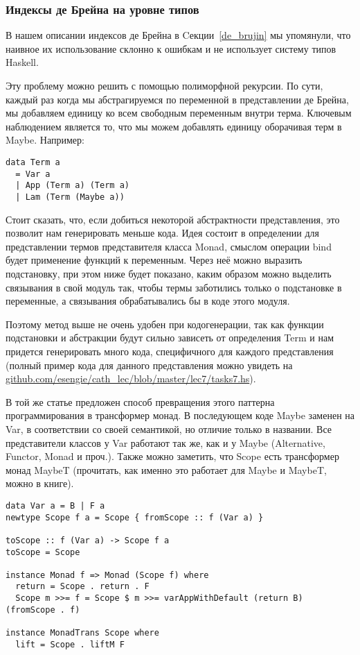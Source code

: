 \subsubsection{Индексы де Брейна на уровне типов}\label{de_brujin_impl}
В нашем описании индексов де Брейна в Cекции~\ref{de_brujin} мы упомянули, что наивное их использование склонно к ошибкам и не использует систему типов Haskell.

Эту проблему можно решить с помощью полиморфной рекурсии\cite{Bird:Pat}. По сути, каждый раз когда мы абстрагируемся по переменной в представлении де Брейна, мы добавляем единицу ко всем свободным переменным внутри терма. Ключевым наблюдением является то, что мы можем добавлять единицу оборачивая терм в Maybe. Например:

\begin{lstlisting}[frame=single]
data Term a
  = Var a
  | App (Term a) (Term a)
  | Lam (Term (Maybe a))
\end{lstlisting}

Стоит сказать, что, если добиться некоторой абстрактности представления, это позволит нам генерировать меньше кода. Идея состоит в определении для представлении термов представителя класса Monad, смыслом операции bind будет применение функций к переменным. Через неё можно выразить подстановку, при этом ниже будет показано, каким образом можно выделить связывания в свой модуль так, чтобы термы заботились только о подстановке в переменные, а связывания обрабатывались бы в коде этого модуля.

Поэтому метод выше не очень удобен при кодогенерации, так как функции подстановки и абстракции будут сильно зависеть от определения Term и нам придется генерировать много кода, специфичного для каждого представления (полный пример кода для данного представления можно увидеть на \url{github.com/esengie/cath_lec/blob/master/lec7/tasks7.hs}).

В той же статье предложен способ превращения этого паттерна программирования в трансформер монад. В последующем коде Maybe заменен на Var, в соответствии со своей семантикой, но отличие только в названии. Все представители классов у Var работают так же, как и у Maybe (Alternative, Functor, Monad и проч.). Также можно заметить, что Scope есть трансформер монад MaybeT (прочитать, как именно это работает для Maybe и MaybeT, можно в книге\cite{moronuki}).

\begin{lstlisting}[frame=single]
data Var a = B | F a
newtype Scope f a = Scope { fromScope :: f (Var a) }

toScope :: f (Var a) -> Scope f a
toScope = Scope

instance Monad f => Monad (Scope f) where
  return = Scope . return . F
  Scope m >>= f = Scope $ m >>= varAppWithDefault (return B) (fromScope . f)

instance MonadTrans Scope where
  lift = Scope . liftM F
\end{lstlisting}

